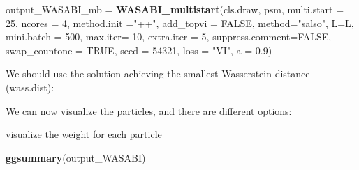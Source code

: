 \documentclass[
]{article}
\newenvironment{Shaded}{\begin{snugshade}}{\end{snugshade}}
\newcommand{\AttributeTok}[1]{\textcolor[rgb]{0.13,0.29,0.53}{#1}}
\newcommand{\CommentTok}[1]{\textcolor[rgb]{0.56,0.35,0.01}{\textit{#1}}}
\newcommand{\ConstantTok}[1]{\textcolor[rgb]{0.56,0.35,0.01}{#1}}
\newcommand{\ControlFlowTok}[1]{\textcolor[rgb]{0.13,0.29,0.53}{\textbf{#1}}}
\newcommand{\DecValTok}[1]{\textcolor[rgb]{0.00,0.00,0.81}{#1}}
\newcommand{\FloatTok}[1]{\textcolor[rgb]{0.00,0.00,0.81}{#1}}
\newcommand{\FunctionTok}[1]{\textcolor[rgb]{0.13,0.29,0.53}{\textbf{#1}}}
\newcommand{\NormalTok}[1]{#1}
\newcommand{\OtherTok}[1]{\textcolor[rgb]{0.56,0.35,0.01}{#1}}
\newcommand{\SpecialCharTok}[1]{\textcolor[rgb]{0.81,0.36,0.00}{\textbf{#1}}}
\newcommand{\StringTok}[1]{\textcolor[rgb]{0.31,0.60,0.02}{#1}}
\begin{document}
\begin{Shaded}
\begin{Highlighting}[]
\NormalTok{output\_WASABI\_mb }\OtherTok{=} \FunctionTok{WASABI\_multistart}\NormalTok{(cls.draw, psm,}
                                    \AttributeTok{multi.start =} \DecValTok{25}\NormalTok{, }\AttributeTok{ncores =} \DecValTok{4}\NormalTok{,}
                                    \AttributeTok{method.init =}\StringTok{"++"}\NormalTok{, }\AttributeTok{add\_topvi =} \ConstantTok{FALSE}\NormalTok{,}
                                    \AttributeTok{method=}\StringTok{"salso"}\NormalTok{, }\AttributeTok{L=}\NormalTok{L,}
                                    \AttributeTok{mini.batch =} \DecValTok{500}\NormalTok{,}
                                    \AttributeTok{max.iter=} \DecValTok{10}\NormalTok{, }\AttributeTok{extra.iter =} \DecValTok{5}\NormalTok{,}
                                    \AttributeTok{suppress.comment=}\ConstantTok{FALSE}\NormalTok{,}
                                    \AttributeTok{swap\_countone =} \ConstantTok{TRUE}\NormalTok{,}
                                    \AttributeTok{seed =} \DecValTok{54321}\NormalTok{,}
                                    \AttributeTok{loss =} \StringTok{"VI"}\NormalTok{, }\AttributeTok{a =} \FloatTok{0.9}\NormalTok{)}
\end{Highlighting}
\end{Shaded}

We should use the solution achieving the smallest Wasserstein distance
(wass.dist):

\begin{Shaded}
\end{Shaded}

We can now visualize the particles, and there are different options:

visualize the weight for each particle

\begin{Shaded}
\begin{Highlighting}[]
\FunctionTok{ggsummary}\NormalTok{(output\_WASABI)}
\end{Highlighting}
\end{Shaded}
\end{document}
